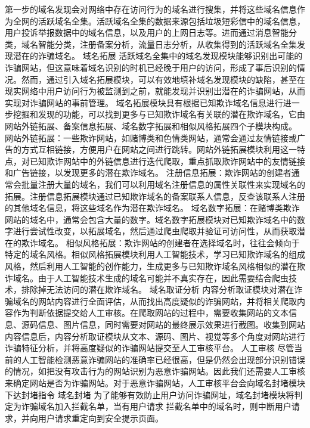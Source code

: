第一步的域名发现会对网络中存在访问行为的域名进行搜集，并将这些域名信息作为全网的活跃域名全集。活跃域名全集的数据来源包括垃圾短彩信中的域名信息，用户投诉举报数据中的域名信息，以及用户的上网日志等。进而通过消息智能分类，域名智能分类，注册备案分析，流量日志分析，从收集得到的活跃域名全集发现潜在的诈骗域名。
域名拓展
活跃域名全集中的域名发现模块能够识别出可能的诈骗网站，但这意味着域名识别的时机已经晚于用户的访问，形成了事后识别的情况。然而，通过引入域名拓展模块，可以有效地填补域名发现模块的缺陷，甚至在现实网络中用户访问行为被监测到之前，就能发现并识别出潜在的诈骗网站，从而实现对诈骗网站的事前管理。
域名拓展模块具有根据已知欺诈域名信息进行进一步挖掘和发现的功能，可以找到更多与已知欺诈域名有关联的潜在欺诈域名，它由网站外链拓展、备案信息拓展、域名数字拓展和相似风格拓展四个子模块构成。
网站外链拓展：一些欺诈网站，如赌博类和色情类网站，通常会通过友情链接或广告的方式互相链接，方便用户在网站之间进行跳转。网站外链拓展模块利用这一特点，对已知欺诈网站中的外链信息进行迭代爬取，重点抓取欺诈网站中的友情链接和广告链接，以发现更多的潜在欺诈域名。
注册信息拓展：欺诈网站的创建者通常会批量注册大量的域名，我们可以利用域名注册信息的属性关联性来实现域名的拓展。注册信息拓展模块通过已知欺诈域名的备案联系人信息，反查该联系人注册的其他域名信息，将这些域名作为潜在欺诈域名。
域名数字拓展：在赌博类欺诈网站的域名中，通常会包含大量的数字。域名数字拓展模块对已知欺诈域名中的数字进行尝试性改变，以拓展域名，然后通过爬虫爬取并验证可访问性，从而获取潜在的欺诈域名。
相似风格拓展：欺诈网站的创建者在选择域名时，往往会倾向于特定的域名风格。相似风格拓展模块利用人工智能技术，学习已知欺诈域名的组成风格，然后利用人工智能的创作能力，生成更多与已知欺诈域名风格相似的潜在欺诈域名。由于人工智能技术生成的域名可能并不真实存在，因此需要结合爬虫技术，排除掉无法访问的潜在欺诈域名。
域名取证分析
内容分析取证模块对潜在诈骗域名的网站内容进行全面评估，从而找出高度疑似的诈骗网站，并将相关爬取内容作为判断依据提交给人工审核。在爬取网站的过程中，需要收集网站的文本信息、源码信息、图片信息，同时需要对网站的最终展示效果进行截图。收集到网站内容信息后，内容分析取证模块从文本、源码、图片、视觉等多个角度对网站进行诈骗特征分析，并将高度疑似的诈骗网站提交至人工审核平台。
人工审核
尽管当前的人工智能检测恶意诈骗网站的准确率已经很高，但是仍然会出现部分识别错误的情况，如把没有攻击行为的网站识别为恶意诈骗网站。因此我们还需要人工审核来确定网站是否为诈骗网站。对于恶意诈骗网站，人工审核平台会向域名封堵模块下达封堵指令
域名封堵
为了能够有效防止用户访问诈骗网址，域名封堵模块将判定为诈骗域名加入拦截名单，当有用户请求 拦截名单中的域名时，则中断用户请求，并向用户请求重定向到安全提示页面。